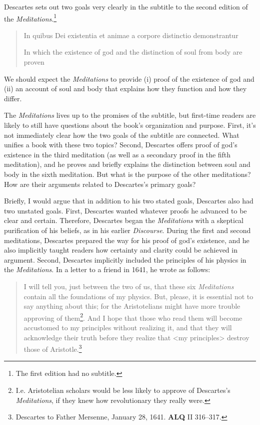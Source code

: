 Descartes sets out two goals very clearly in the subtitle to the second edition of the \textit{Meditations}.\footnote{The first edition had no subtitle.}

\begin{quote}
    In quibus Dei existentia et animae a corpore distinctio demonstrantur

    In which the existence of god and the distinction of soul from body are proven
\end{quote}
We should expect the \textit{Meditations} to provide (i) proof of the existence of god and (ii) an account of soul and body that explains how they function and how they differ.

The \textit{Meditations} lives up to the promises of the subtitle, but first-time readers are likely to still have questions about the book's organization and purpose. First, it's not immediately clear how the two goals of the subtitle are connected. What unifies a book with these two topics? Second, Descartes offers proof of god's existence in the third meditation (as well as a secondary proof in the fifth meditation), and he proves and briefly explains the distinction between soul and body in the sixth meditation. But what is the purpose of the other meditations? How are their arguments related to Descartes's primary goals?

Briefly, I would argue that in addition to his two stated goals, Descartes also had two unstated goals. First, Descartes wanted whatever proofs he advanced to be clear and certain. Therefore, Descartes began the \textit{Meditations} with a skeptical purification of his beliefs, as in his earlier \textit{Discourse}. During the first and second meditations, Descartes prepared the way for his proof of god's existence, and he also implicitly taught readers how certainty and clarity could be achieved in argument. Second, Descartes implicitly included the principles of his physics in the \textit{Meditations}. In a letter to a friend in 1641, he wrote as follows:

\begin{quote}
    I will tell you, just between the two of us, that these six \textit{Meditations} contain all the foundations of my physics. But, please, it is essential not to say anything about this; for the Aristotelians might have more trouble approving of them\footnote{I.e. Aristotelian scholars would be less likely to approve of Descartes's \textit{Meditations}, if they knew how revolutionary they really were.}. And I hope that those who read them will become accustomed to my principles without realizing it, and that they will acknowledge their truth before they realize that <my principles> destroy those of Aristotle.\footnote{Descartes to Father Mersenne, January 28, 1641. \textbf{ALQ} II 316--317.}
\end{quote}

